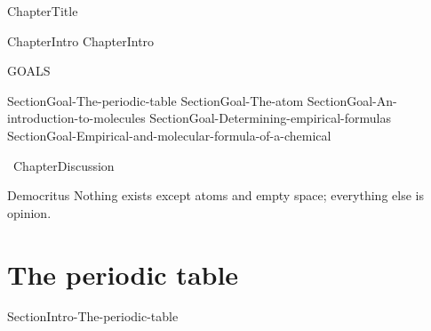 \documentclass[main.tex]{subfiles}
\newcommand\chapterlabel{Ch-Table}\setcounter{figurenewcounter}{0}\setcounter{tablenewcounter}{0}\setcounter{formulanewcounter}{0}
\begin{document}
\linenumbers


 {ChapterTitle}
 

 
 
\begin{marginfigure}
      \texttt{[image: ../\{\\chapterlabel]}/figure1}
   \end{marginfigure}
   
 {ChapterIntro}
 ChapterIntro
\begin{marginfigure}%
\begin{mytcbox}{GOALS}
\begin{enumerate}[label=\protect\circled{\color{white}\arabic*}]
  {SectionGoal-The-periodic-table}
 {SectionGoal-The-atom}
  {SectionGoal-An-introduction-to-molecules}
 {SectionGoal-Determining-empirical-formulas}
 {SectionGoal-Empirical-and-molecular-formula-of-a-chemical}
\end{enumerate}
\end{mytcbox}
\vspace{1cm}
\begin{tcolorbox}[enhanced,colback=red!5!white,colframe=black!50!red,boxrule=1pt,
  arc=0pt,outer arc=0pt,drop heavy lifted shadow]
\faGears\ 
 {ChapterDiscussion}
 \end{tcolorbox}

\vspace{1cm}    

\begin{shadequote}[l]{Democritus}
Nothing exists except atoms and empty space; everything else is opinion.
\end{shadequote}   

\end{marginfigure}%









\section{The periodic table}
{SectionIntro-The-periodic-table}
\end{document}
